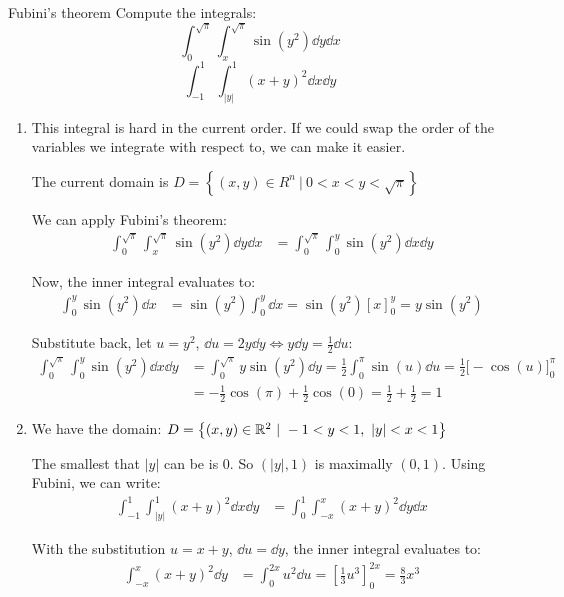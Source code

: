 \documentclass[12pt]{article}
\begin{document}
\begin{problem}{Fubini's theorem}{}
    Compute the integrals:
    $$
        \int_0^{\sqrt{\pi}} \int_x^{\sqrt{\pi}} \sin(y^2) \dd y \dd x
    $$
    $$
        \int_{-1}^{1} \int_{|y|}^{1} (x + y)^2 \dd x \dd y
    $$
\end{problem}
\begin{enumerate}
    \item This integral is hard in the current order. If we could swap the order of the variables we integrate with respect to, we can make it easier. 
    
    The current domain is $D = \left\{(x, y) \in R^n \ |\ 0 < x < y < \sqrt{\pi}\right\}$


    We can apply Fubini's theorem:
    $$
    \begin{aligned}
        \int_0^{\sqrt{\pi}} \int_x^{\sqrt{\pi}} \sin(y^2) \dd y \dd x &= \int_0^{\sqrt{\pi}} \int_0^{y} \sin(y^2) \dd x \dd y
    \end{aligned}
    $$

    Now, the inner integral evaluates to:
    $$
    \begin{aligned}
        \int_0^{y} \sin(y^2) \dd x &= \sin(y^2) \int_0^{y} \dd x = \sin(y^2) \left[x\right]_0^y = y\sin(y^2)
    \end{aligned}
    $$

    Substitute back, let $u = y^2$, $\dd u = 2y \dd y \iff y \dd y = \frac{1}{2} \dd u$:
    $$
    \begin{aligned}
        \int_0^{\sqrt{\pi}} \int_0^{y} \sin(y^2) \dd x \dd y &= \int_0^{\sqrt{\pi}} y\sin(y^2) \dd y = \frac{1}{2} \int_0^{\pi} \sin(u) \dd u = \frac{1}{2}\Big[ -\cos(u) \Big]_0^\pi \\
        &= -\frac{1}{2} \cos(\pi) + \frac{1}{2} \cos(0) = \frac{1}{2} + \frac{1}{2} = \boxed{1}
    \end{aligned}
    $$

    \item We have the domain: $D = \left\{ (x, y) \in \mathbb{R}^2 \ |\ -1 < y < 1,\ |y| < x < 1 \right\}$ 
    
    The smallest that $|y|$ can be is $0$. So $(|y|, 1)$ is maximally $(0, 1)$. Using Fubini, we can write:
    $$
    \begin{aligned}
        \int_{-1}^{1} \int_{|y|}^{1} (x + y)^2 \dd x \dd y &= \int_{0}^{1} \int_{-x}^{x} (x + y)^2 \dd y \dd x
    \end{aligned}
    $$

    With the substitution $u = x + y$, $\dd u = \dd y$, the inner integral evaluates to:
    $$
        \begin{aligned}
            \int_{-x}^{x} (x + y)^2 \dd y &= \int_{0}^{2x} u^2 \dd u = \left[ \frac{1}{3} u^3 \right]_{0}^{2x} = \frac{8}{3}x^3
        \end{aligned}
    $$


\end{enumerate}
\end{document}
